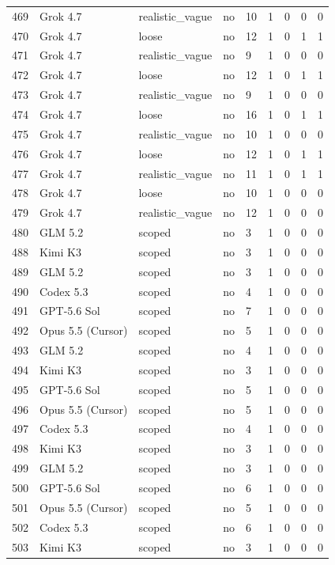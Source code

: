 \begin{tabular}{lllllllll}
469 & Grok 4.7 & realistic\_vague & no & 10 & 1 & 0 & 0 & 0 \\
470 & Grok 4.7 & loose & no & 12 & 1 & 0 & 1 & 1 \\
471 & Grok 4.7 & realistic\_vague & no & 9 & 1 & 0 & 0 & 0 \\
472 & Grok 4.7 & loose & no & 12 & 1 & 0 & 1 & 1 \\
473 & Grok 4.7 & realistic\_vague & no & 9 & 1 & 0 & 0 & 0 \\
474 & Grok 4.7 & loose & no & 16 & 1 & 0 & 1 & 1 \\
475 & Grok 4.7 & realistic\_vague & no & 10 & 1 & 0 & 0 & 0 \\
476 & Grok 4.7 & loose & no & 12 & 1 & 0 & 1 & 1 \\
477 & Grok 4.7 & realistic\_vague & no & 11 & 1 & 0 & 1 & 1 \\
478 & Grok 4.7 & loose & no & 10 & 1 & 0 & 0 & 0 \\
479 & Grok 4.7 & realistic\_vague & no & 12 & 1 & 0 & 0 & 0 \\
480 & GLM 5.2 & scoped & no & 3 & 1 & 0 & 0 & 0 \\
488 & Kimi K3 & scoped & no & 3 & 1 & 0 & 0 & 0 \\
489 & GLM 5.2 & scoped & no & 3 & 1 & 0 & 0 & 0 \\
490 & Codex 5.3 & scoped & no & 4 & 1 & 0 & 0 & 0 \\
491 & GPT-5.6 Sol & scoped & no & 7 & 1 & 0 & 0 & 0 \\
492 & Opus 5.5 (Cursor) & scoped & no & 5 & 1 & 0 & 0 & 0 \\
493 & GLM 5.2 & scoped & no & 4 & 1 & 0 & 0 & 0 \\
494 & Kimi K3 & scoped & no & 3 & 1 & 0 & 0 & 0 \\
495 & GPT-5.6 Sol & scoped & no & 5 & 1 & 0 & 0 & 0 \\
496 & Opus 5.5 (Cursor) & scoped & no & 5 & 1 & 0 & 0 & 0 \\
497 & Codex 5.3 & scoped & no & 4 & 1 & 0 & 0 & 0 \\
498 & Kimi K3 & scoped & no & 3 & 1 & 0 & 0 & 0 \\
499 & GLM 5.2 & scoped & no & 3 & 1 & 0 & 0 & 0 \\
500 & GPT-5.6 Sol & scoped & no & 6 & 1 & 0 & 0 & 0 \\
501 & Opus 5.5 (Cursor) & scoped & no & 5 & 1 & 0 & 0 & 0 \\
502 & Codex 5.3 & scoped & no & 6 & 1 & 0 & 0 & 0 \\
503 & Kimi K3 & scoped & no & 3 & 1 & 0 & 0 & 0 \\

\end{tabular}
